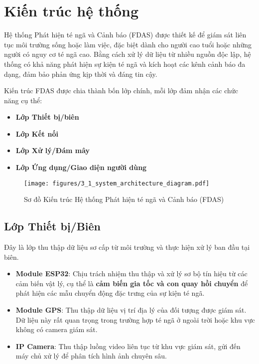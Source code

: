 
\section{Kiến trúc hệ thống}
\label{sec:system_architecture}

Hệ thống Phát hiện té ngã và Cảnh báo (FDAS) được thiết kế để giám sát liên tục môi trường sống hoặc làm việc, đặc biệt dành cho người cao tuổi hoặc những người có nguy cơ té ngã cao. Bằng cách xử lý dữ liệu từ nhiều nguồn độc lập, hệ thống có khả năng phát hiện sự kiện té ngã và kích hoạt các kênh cảnh báo đa dạng, đảm bảo phản ứng kịp thời và đáng tin cậy.

Kiến trúc FDAS được chia thành bốn lớp chính, mỗi lớp đảm nhận các chức năng cụ thể: 
\begin{itemize}
    \item \textbf{Lớp Thiết bị\slash biên} 
    \item \textbf{Lớp Kết nối}
    \item \textbf{Lớp Xử lý\slash Đám mây}
    \item \textbf{Lớp Ứng dụng\slash Giao diện người dùng}
\end{itemize}

\begin{figure}[H]
    \centering
    \texttt{[image: figures/3\_1\_system\_architecture\_diagram.pdf]}
    \caption{Sơ đồ Kiến trúc Hệ thống Phát hiện té ngã và Cảnh báo (FDAS)}
    \label{fig:system_architecture}
\end{figure}

\subsection{Lớp Thiết bị\slash  Biên}
Đây là lớp thu thập dữ liệu sơ cấp từ môi trường và thực hiện xử lý ban đầu tại biên.
\begin{itemize}
    \item \textbf{Module ESP32}: Chịu trách nhiệm thu thập và xử lý sơ bộ tín hiệu từ các cảm biến vật lý, cụ thể là \textbf{cảm biến gia tốc  và con quay hồi chuyển} để phát hiện các mẫu chuyển động đặc trưng của sự kiện té ngã.
    \item \textbf{Module GPS}: Thu thập dữ liệu vị trí địa lý của đối tượng được giám sát. Dữ liệu này rất quan trọng trong trường hợp té ngã ở ngoài trời hoặc khu vực không có camera giám sát.
    \item \textbf{IP Camera}: Thu thập luồng video liên tục từ khu vực giám sát, gửi đến máy chủ xử lý để phân tích hình ảnh chuyên sâu.
\end{itemize}

